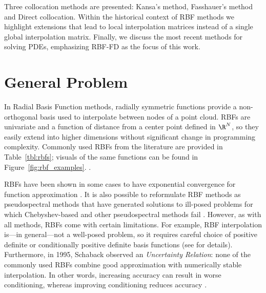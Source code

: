 \documentclass{report}
\begin{document}
{%
Three collocation methods are presented: Kansa's method, Fasshauer's method and Direct collocation. Within the historical context of RBF methods we highlight extensions that lead to local interpolation matrices instead of a single global interpolation matrix. Finally, we discuss the most recent methods for solving PDEs, emphasizing RBF-FD as the focus of this work. 

\section{General Problem}

In Radial Basis Function methods, radially symmetric functions provide a non-orthogonal basis used to interpolate between 
nodes of a point cloud. RBFs are univariate and a function of distance from a center point defined in $\R^N$, so 
they easily extend into higher dimensions without significant change in programming complexity. Commonly used RBFs from the literature are provided in Table~\ref{tbl:rbfs}; visuals of the same functions can be found in Figure~\ref{fig:rbf_examples}. .






RBFs have been shown in 
some cases to have exponential convergence for function approximation \cite{Fasshauer2007}. It is also possible to 
reformulate RBF methods as pseudospectral methods that have 
generated solutions to ill-posed problems for which Chebyshev-based and other pseudospectral methods 
fail \cite{Fasshauer2006}. However, as with all methods, RBFs come with certain limitations. For example, RBF interpolation is---in general---not a well-posed problem, so it requires careful choice of positive definite or conditionally positive definite basis functions (see \cite{Iske2004, Fasshauer2007} for details). Furthermore, in 1995,  
Schaback \cite{Schaback1995} observed an \emph{Uncertainty Relation}: none of the commonly used RBFs combine 
good approximation with numerically stable interpolation. In other words, increasing accuracy can result in worse conditioning, 
whereas improving conditioning reduces accuracy \cite{Schaback1995, Iske2004}. 

}
\end{document}
